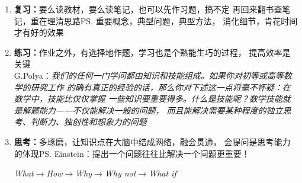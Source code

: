 \begin{itemize}
\begin{enumerate}
	  简要记笔记\ps{推荐：\b 康奈尔笔记法}，重点记思路和书本上没有的内容
	  \item {\bf 复习：}要么读教材，要么读笔记，也可以先作习题，搞不定
	  再回来翻书查笔记，重在理清思路\ps{重要概念，典型问题，典型方法}，
	  消化细节，肯花时间才有好的效果
	  \item {\bf 练习：}作业之外，有选择地作题，学习也是个熟能生巧的过程，
	  提高效率是关键\\
	  G.Polya：{\it 我们的任何一门学问都由知识和技能组成。如果你对初等或高等数学的研究工作
	  的确有真正的经验的话，那么你对下述这一点将毫不怀疑：在数学中，技能比仅仅掌握
	  一些知识要重要得多。什么是技能呢？数学技能就是解题能力——不仅能解决一般的问题，
	  而且能解决需要某种程度的独立思考、判断力、独创性和想象力的问题}
	  \item {\bf 思考：}多琢磨，让知识点在大脑中结成网络，融会贯通，
	  会提问是思考能力的体现\ps{Einstein：提出一个问题往往比解决一个问题更重要！}
	  \centerline{\it What$\to$How$\to$Why$\to$Why not$\to$What if}
	\end{enumerate}
\end{itemize}

